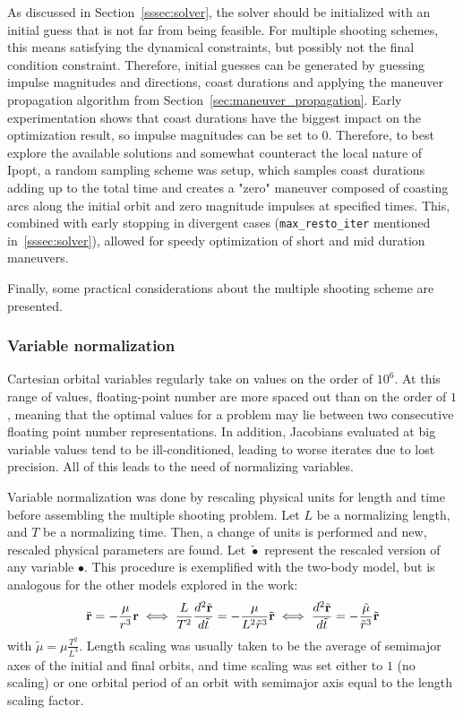 As discussed in Section~\ref{sssec:solver}, the solver should be initialized with an initial guess that is not far from being feasible. For multiple shooting schemes, this means satisfying the dynamical constraints, but possibly not the final condition constraint. Therefore, initial guesses can be generated by guessing impulse magnitudes and directions, coast durations and applying the maneuver propagation algorithm from Section~\ref{sec:maneuver_propagation}. Early experimentation shows that coast durations have the biggest impact on the optimization result, so impulse magnitudes can be set to 0. Therefore, to best explore the available solutions and somewhat counteract the local nature of Ipopt, a random sampling scheme was setup, which samples coast durations adding up to the total time and creates a "zero" maneuver composed of coasting arcs along the initial orbit and zero magnitude impulses at specified times. This, combined with early stopping in divergent cases (\texttt{max\_resto\_iter} mentioned in~\ref{sssec:solver}), allowed for speedy optimization of short and mid duration maneuvers.

Finally, some practical considerations about the multiple shooting scheme are presented.

\subsubsection{Variable normalization}

Cartesian orbital variables regularly take on values on the order of \(10^6\). At this range of values, floating-point number are more spaced out than on the order of \(1\), meaning that the optimal values for a problem may lie between two consecutive floating point number representations. In addition, Jacobians evaluated at big variable values tend to be ill-conditioned, leading to worse iterates due to lost precision. All of this leads to the need of normalizing variables.

Variable normalization was done by rescaling physical units for length and time before assembling the multiple shooting problem. Let \(L\) be a normalizing length, and \(T\) be a normalizing time. Then, a change of units is performed and new, rescaled physical parameters are found. Let \(\tilde{\bullet}\) represent the rescaled version of any variable \(\bullet\). This procedure is exemplified with the two-body model, but is analogous for the other models explored in the work:
\begin{equation}
    \ddot{\mathbf{r}} = -\frac{\mu}{r^3} \mathbf{r} \iff \frac{L}{T^2}\frac{d^2 \tilde{\mathbf{r}}}{d \tilde{t}} = -\frac{\mu}{L^2 \tilde{r}^3} \tilde{\mathbf{r}} \iff \frac{d^2 \tilde{\mathbf{r}}}{d \tilde{t}} = -\frac{\tilde{\mu}}{\tilde{r}^3} \tilde{\mathbf{r}}
\end{equation}
with \(\tilde{\mu} = \mu \frac{T^2}{L^3}\). Length scaling was usually taken to be the average of semimajor axes of the initial and final orbits, and time scaling was set either to \(1\) (no scaling) or one orbital period of an orbit with semimajor axis equal to the length scaling factor.

